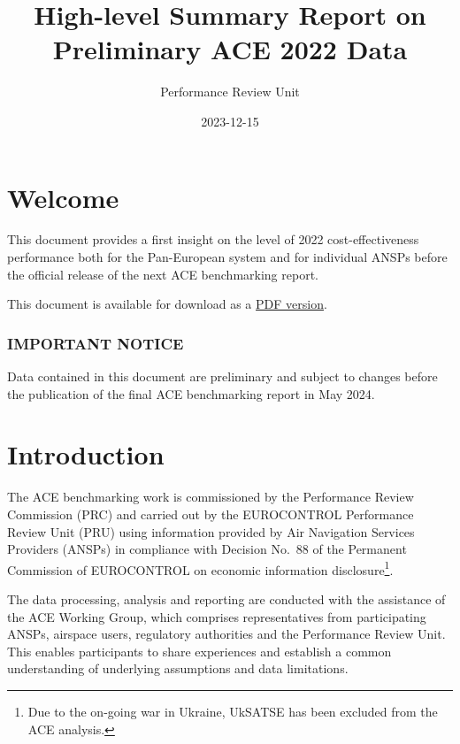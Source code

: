 \documentclass[
  letterpaper,
  DIV=11,
  numbers=noendperiod]{scrreprt}
\title{High-level Summary Report on Preliminary ACE 2022 Data}
\author{Performance Review Unit}
\date{2023-12-15}
\renewcommand*\contentsname{Table of contents}
\newcommand\contentsname{Table of contents}
\begin{document}
\maketitle

\renewcommand*\contentsname{Table of contents}
{
\hypersetup{linkcolor=}
\setcounter{tocdepth}{2}
\tableofcontents
}
\listoffigures
{}

\chapter*{Welcome}\label{welcome}


This document provides a first insight on the level of 2022
cost-effectiveness performance both for the Pan-European system and for
individual ANSPs before the official release of the next ACE
benchmarking report.

This document is available for download as a
\href{https://www.eurocontrol.int/sites/default/files/2023-12/eurocontrol-summary-report-preliminary-ace-2022-data.pdf}{PDF
version}.

\subsection*{IMPORTANT NOTICE}\label{important-notice}

{Data contained in this document are preliminary and subject to changes
before the publication of the final ACE benchmarking report in May
2024.}


\chapter{Introduction}\label{dec-intro}

The ACE benchmarking work is commissioned by the Performance Review
Commission (PRC) and carried out by the EUROCONTROL Performance Review
Unit (PRU) using information provided by Air Navigation Services
Providers (ANSPs) in compliance with Decision No.~88 of the Permanent
Commission of EUROCONTROL on economic information disclosure\footnote{Due
  to the on-going war in Ukraine, UkSATSE has been excluded from the ACE
  analysis.}.

The data processing, analysis and reporting are conducted with the
assistance of the ACE Working Group, which comprises representatives
from participating ANSPs, airspace users, regulatory authorities and the
Performance Review Unit. This enables participants to share experiences
and establish a common understanding of underlying assumptions and data
limitations.
\end{document}
